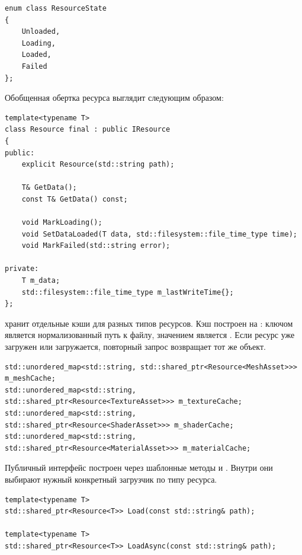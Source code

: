 \documentclass[14pt,a4paper]{extarticle}
\begin{document}
\begin{lstlisting}[style=cppgost,caption={Состояния ресурса}]
enum class ResourceState
{
    Unloaded,
    Loading,
    Loaded,
    Failed
};
\end{lstlisting}

Обобщенная обертка ресурса выглядит следующим образом:

\begin{lstlisting}[style=cppgost,caption={Общий принцип Resource}]
template<typename T>
class Resource final : public IResource
{
public:
    explicit Resource(std::string path);

    T& GetData();
    const T& GetData() const;

    void MarkLoading();
    void SetDataLoaded(T data, std::filesystem::file_time_type time);
    void MarkFailed(std::string error);

private:
    T m_data;
    std::filesystem::file_time_type m_lastWriteTime{};
};
\end{lstlisting}

 хранит отдельные кэши для разных типов ресурсов. Кэш построен на
: ключом является нормализованный путь к файлу, значением является
. Если ресурс уже загружен или загружается, повторный запрос
возвращает тот же объект.

\begin{lstlisting}[style=cppgost,caption={Кэши ResourceManager}]
std::unordered_map<std::string, std::shared_ptr<Resource<MeshAsset>>> m_meshCache;
std::unordered_map<std::string, std::shared_ptr<Resource<TextureAsset>>> m_textureCache;
std::unordered_map<std::string, std::shared_ptr<Resource<ShaderAsset>>> m_shaderCache;
std::unordered_map<std::string, std::shared_ptr<Resource<MaterialAsset>>> m_materialCache;
\end{lstlisting}

Публичный интерфейс построен через шаблонные методы  и . Внутри они
выбирают нужный конкретный загрузчик по типу ресурса.

\begin{lstlisting}[style=cppgost,caption={Интерфейс загрузки ресурсов}]
template<typename T>
std::shared_ptr<Resource<T>> Load(const std::string& path);

template<typename T>
std::shared_ptr<Resource<T>> LoadAsync(const std::string& path);
\end{lstlisting}
\end{document}
